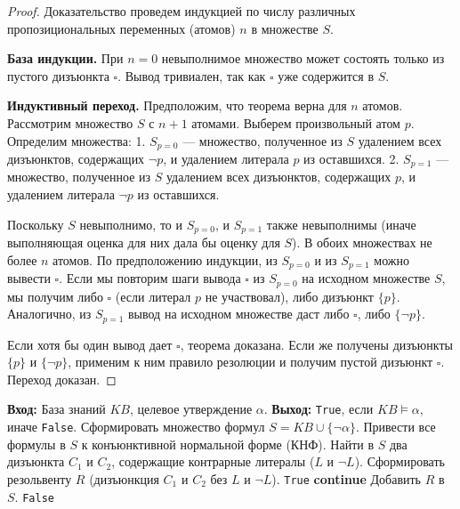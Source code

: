 \documentclass[12pt,a4paper]{article}
\begin{document}
\begin{proof}
Доказательство проведем индукцией по числу различных пропозициональных переменных (атомов) $n$ в множестве $S$.

\textbf{База индукции.} При $n=0$ невыполнимое множество может состоять только из пустого дизъюнкта $\square$. Вывод тривиален, так как $\square$ уже содержится в $S$.

\textbf{Индуктивный переход.} Предположим, что теорема верна для $n$ атомов. Рассмотрим множество $S$ с $n+1$ атомами. Выберем произвольный атом $p$.
Определим множества:
1. $S_{p=0}$ — множество, полученное из $S$ удалением всех дизъюнктов, содержащих $\neg p$, и удалением литерала $p$ из оставшихся.
2. $S_{p=1}$ — множество, полученное из $S$ удалением всех дизъюнктов, содержащих $p$, и удалением литерала $\neg p$ из оставшихся.

Поскольку $S$ невыполнимо, то и $S_{p=0}$, и $S_{p=1}$ также невыполнимы (иначе выполняющая оценка для них дала бы оценку для $S$). В обоих множествах не более $n$ атомов.
По предположению индукции, из $S_{p=0}$ и из $S_{p=1}$ можно вывести $\square$.
Если мы повторим шаги вывода $\square$ из $S_{p=0}$ на исходном множестве $S$, мы получим либо $\square$ (если литерал $p$ не участвовал), либо дизъюнкт $\{p\}$. Аналогично, из $S_{p=1}$ вывод на исходном множестве даст либо $\square$, либо $\{\neg p\}$.

Если хотя бы один вывод дает $\square$, теорема доказана. Если же получены дизъюнкты $\{p\}$ и $\{\neg p\}$, применим к ним правило резолюции и получим пустой дизъюнкт $\square$. Переход доказан.
\end{proof}

\begin{algorithm}
\caption{Алгоритм вывода методом резолюций (опровержение)}\label{alg:resolution}
\begin{algorithmic}[1]
\State \textbf{Вход:} База знаний $KB$, целевое утверждение $\alpha$.
\State \textbf{Выход:} \texttt{True}, если $KB \models \alpha$, иначе \texttt{False}.
\State Сформировать множество формул $S = KB \cup \{\neg \alpha\}$.
\State Привести все формулы в $S$ к конъюнктивной нормальной форме (КНФ).
\Loop
    \State Найти в $S$ два дизъюнкта $C_1$ и $C_2$, содержащие контрарные литералы ($L$ и $\neg L$).
    \State Сформировать резольвенту $R$ (дизъюнкция $C_1$ и $C_2$ без $L$ и $\neg L$).
        \State \Return \texttt{True}
    \EndIf
        \State \textbf{continue}
    \EndIf
    \State Добавить $R$ в $S$.
        \State \Return \texttt{False}
    \EndIf
\EndLoop
\end{algorithmic}
\end{algorithm}
\end{document}
